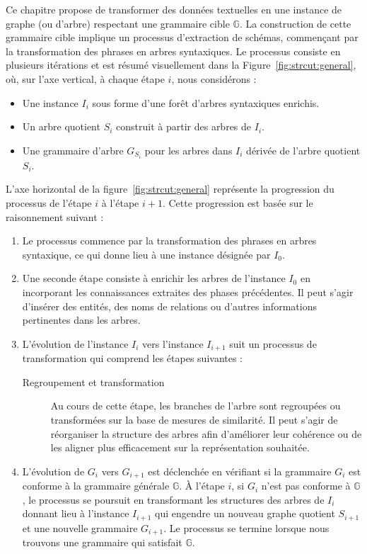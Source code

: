 Ce chapitre propose de transformer des données textuelles en une instance de graphe (ou d'arbre) respectant une grammaire cible $\mathbb{G}$.
La construction de cette grammaire cible implique un processus d'extraction de schémas, commençant par la transformation des phrases en arbres syntaxiques.
Le processus consiste en plusieurs itérations et est résumé visuellement dans la Figure~\ref{fig:strcut:general}, où, sur l'axe vertical, à chaque étape $i$, nous considérons :
\begin{itemize}
    \item Une instance $I_i$ sous forme d'une forêt d'arbres syntaxiques enrichis.
    \item Un arbre quotient $S_i$ construit à partir des arbres de $I_i$.
    \item Une grammaire d'arbre $G_{S_i}$ pour les arbres dans $I_i$ dérivée de l'arbre quotient $S_i$.
\end{itemize}

L'axe horizontal de la figure~\ref{fig:strcut:general} représente la progression du processus de l'étape $i$ à l'étape $i+1$. Cette progression est basée sur le raisonnement suivant :
\begin{enumerate}
    \item Le processus commence par la transformation des phrases en arbres syntaxique, ce qui donne lieu à une instance désignée par $I_0$.

    \item Une seconde étape consiste à enrichir les arbres de l'instance $I_0$ en incorporant les connaissances extraites des phases précédentes. Il peut s'agir d'insérer des entités, des noms de relations ou d'autres informations pertinentes dans les arbres.

    \item L'évolution de l'instance $I_i$ vers l'instance $I_{i+1}$ suit un processus de transformation qui comprend les étapes suivantes :
          \begin{description}
              \item[Regroupement et transformation] Au cours de cette étape, les branches de l'arbre sont regroupées ou transformées sur la base de mesures de similarité. Il peut s'agir de réorganiser la structure des arbres afin d'améliorer leur cohérence ou de les aligner plus efficacement sur la représentation souhaitée.
          \end{description}

    \item L'évolution de $G_i$ vers $G_{i+1}$ est déclenchée en vérifiant si la grammaire $G_i$ est conforme à la grammaire générale $\mathbb{G}$.
          À l'étape $i$, si $G_i$ n'est pas conforme à $\mathbb{G}$, le processus se poursuit en transformant les structures des arbres de $I_i$ donnant lieu à l'instance $I_{i+1}$ qui engendre un nouveau graphe quotient $S_{i+1}$ et une nouvelle grammaire $G_{i+1}$.
          Le processus se termine lorsque nous trouvons une grammaire qui satisfait $\mathbb{G}$.
\end{enumerate}

